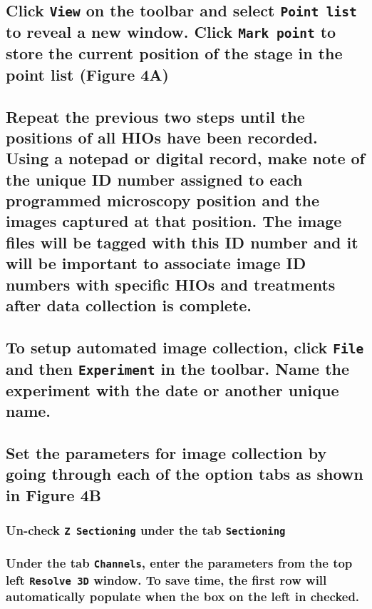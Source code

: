 \documentclass[11pt]{article}
\begin{document}
\subsection{{\sffamily } Click \texttt{View} on the toolbar and select \texttt{Point list} to reveal a new window. Click \texttt{Mark point} to store the current position of the stage in the point list (\textbf{Figure 4A})}
\label{sec:orgheadline64}

\subsection{{\sffamily } Repeat the previous two steps until the positions of all HIOs have been recorded. Using a notepad or digital record, make note of the unique ID number assigned to each programmed microscopy position and the images captured at that position. The image files will be tagged with this ID number and it will be important to  associate image ID numbers with specific HIOs and treatments after data collection is complete.}
\label{sec:orgheadline65}

\subsection{{\sffamily } To setup automated image collection, click \texttt{File} and then \texttt{Experiment} in the toolbar. Name the experiment with the date or another unique name.}
\label{sec:orgheadline66}

\subsection{{\sffamily } Set the parameters for image collection by going through each of the option tabs as shown in \textbf{Figure 4B}}
\label{sec:orgheadline74}

\subsubsection{{\sffamily } Un-check \texttt{Z Sectioning} under the tab \texttt{Sectioning}}
\label{sec:orgheadline67}

\subsubsection{{\sffamily } Under the tab \texttt{Channels}, enter the parameters from the top left \texttt{Resolve 3D} window. To save time, the first row will automatically populate when the box on the left in checked.}
\label{sec:orgheadline68}
\end{document}
